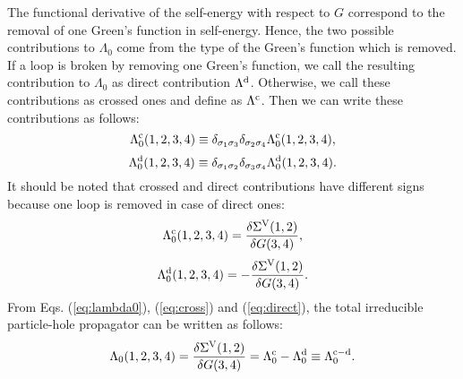 The functional derivative of the self-energy with respect to $G$ 
correspond to the removal of one Green's function in self-energy. 
Hence, the two possible contributions to $\Lambda_0$ come from
the type of the Green's function which is removed.
If a loop is broken by removing one Green's function, we call
the resulting contribution to $\Lambda_0$ as direct contribution $\Lambda^{\rm d}$.
Otherwise, we call these contributions as crossed ones and define as $\Lambda^{\rm c}$.
Then we can write these contributions as follows:
%
\begin{equation}
	\Lambda^{\rm c}_0(1,2,3,4) \equiv \delta_{\sigma_1\sigma_3}
	\delta_{\sigma_2\sigma_4}\Lambda^{\rm c}_0(1,2,3,4),
	\label{eq:defcross}
\end{equation}
%
\begin{equation}
	\Lambda^{\rm d}_0(1,2,3,4) \equiv \delta_{\sigma_1\sigma_2}
	\delta_{\sigma_3\sigma_4}\Lambda^{\rm d}_0(1,2,3,4).
	\label{eq:defdirect}
\end{equation}
%
It should be noted that crossed and direct contributions have different 
signs because one loop is removed in case of direct ones:
%
\begin{equation}
	\Lambda^{\rm c}_0(1,2,3,4) = \frac{\delta\Sigma^{\rm V}(1,2)}
	{\delta G(3,4)}, 
	\label{eq:cross}
\end{equation}
%
\begin{equation}
	\Lambda^{\rm d}_0(1,2,3,4) = -\frac{\delta\Sigma^{\rm V}(1,2)}
	{\delta G(3,4)}.
	\label{eq:direct}
\end{equation}
%
From Eqs. (\ref{eq:lambda0}), (\ref{eq:cross}) and (\ref{eq:direct}), 
the total irreducible particle-hole propagator can be written as follows:
%
\begin{equation}
	\Lambda_0(1,2,3,4) = \frac{\delta\Sigma^{\rm V}(1,2)}{\delta G(3,4)}
	= \Lambda^{\rm c}_0 - \Lambda^{\rm d}_0 \equiv \Lambda^{{\rm c} - {\rm d}}_0.
	\label{eq:lambdadiff}
\end{equation}
%
\begin{figure}[H]
\end{figure}
